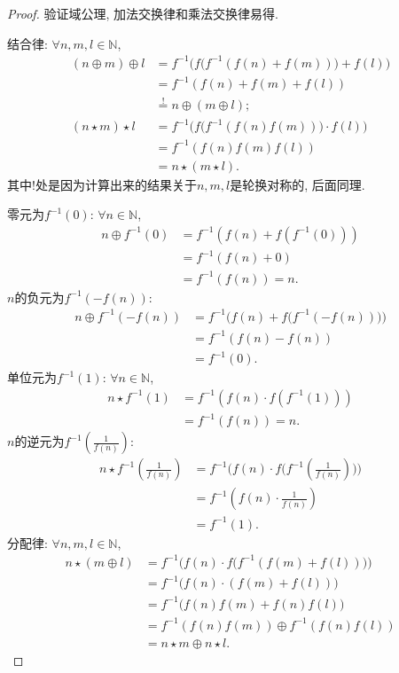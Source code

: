 \begin{proof}
    验证域公理, 加法交换律和乘法交换律易得.

    结合律: $\forall n, m, l \in \mathbb{N}$,
    \[
    \begin{aligned}
        (n \oplus m) \oplus l &= f^{-1}\biggl(f\bigl(f^{-1}(f(n) + f(m))\bigr)+ f(l)\biggr)\\
        &= f^{-1}(f(n) + f(m) + f(l))\\
        &\overset{!}= n \oplus (m \oplus l);\\
        (n \star m) \star l &= f^{-1}\biggl(f\bigl(f^{-1}(f(n)f(m))\bigr) \cdot f(l)\biggr)\\
        &= f^{-1}(f(n)f(m)f(l))\\
        &= n \star (m \star l).
    \end{aligned}
    \]
    其中!处是因为计算出来的结果关于$n, m, l$是轮换对称的, 后面同理.

    零元为$f^{-1}(0)$: $\forall n \in \mathbb{N}$,
    \[
    \begin{aligned}
        n \oplus f^{-1}(0) &= f^{-1}(f(n) + f(f^{-1}(0)))\\
        &= f^{-1}(f(n) + 0)\\
        &= f^{-1}(f(n)) = n.
    \end{aligned}
    \]
    $n$的负元为$f^{-1}(-f(n))$:
    \[
    \begin{aligned}
        n \oplus f^{-1}(-f(n)) &= f^{-1}\biggl(f(n) + f\bigl(f^{-1}(-f(n))\bigr)\biggr)\\
        &= f^{-1}(f(n) - f(n))\\
        &= f^{-1}(0).
    \end{aligned}
    \]
    单位元为$f^{-1}(1)$: $\forall n \in \mathbb{N}$,
    \[
    \begin{aligned}
        n \star f^{-1}(1) &= f^{-1}(f(n) \cdot f(f^{-1}(1)))\\
        &= f^{-1}(f(n)) = n.
    \end{aligned}
    \]
    $n$的逆元为$f^{-1}(\frac1{f(n)})$:
    \[
    \begin{aligned}
        n \star f^{-1}(\frac{1}{f(n)}) &= f^{-1}\biggl(f(n) \cdot f\bigl(f^{-1}(\frac{1}{f(n)})\bigr)\biggr)\\
        &= f^{-1}(f(n) \cdot \frac{1}{f(n)})\\
        &= f^{-1}(1).
    \end{aligned}
    \]
    分配律: $\forall n, m, l \in \mathbb{N}$,
    \[
    \begin{aligned}
        n \star (m \oplus l) &= f^{-1}\biggl(f(n) \cdot f\bigl(f^{-1}(f(m) + f(l))\bigr)\biggr)\\
        &= f^{-1}\bigl(f(n) \cdot (f(m) + f(l))\bigr)\\
        &= f^{-1}\bigl(f(n)f(m) + f(n)f(l)\bigr)\\
        &= f^{-1}(f(n)f(m)) \oplus f^{-1}(f(n)f(l))\\
        &= n \star m \oplus n \star l.
    \end{aligned}
    \]
\end{proof}

